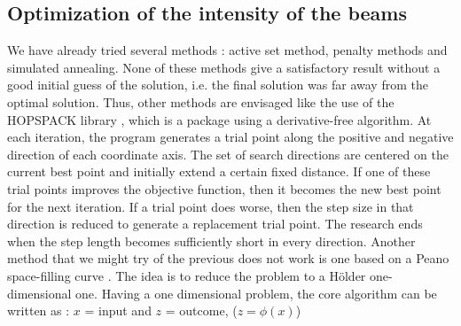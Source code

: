\subsection{Optimization of the intensity of the beams}
We have already tried several methods : active set method, penalty methods
and simulated annealing. None of these methods give a satisfactory result
without a good initial guess of the solution, i.e. the final solution was far
away from the optimal solution. Thus, other methods are envisaged like the 
use of the HOPSPACK library \cite{hopspack}, which is a package using a 
derivative-free algorithm. At each iteration, the program generates a trial 
point along the positive and negative direction of each coordinate axis. 
The set of search directions are centered on the current best point and 
initially extend a certain fixed distance. If one of these trial points 
improves the objective function, then it becomes the new best point for 
the next iteration. If a trial point does worse, then the step size in 
that direction is reduced to generate a replacement trial point. The research 
ends when the step length becomes sufficiently short in every direction. 
Another method that we might try of the previous does not work is one based 
on a Peano space-filling curve \cite{livre}. The idea is to reduce the 
problem to a H\"{o}lder one-dimensional one. Having a one dimensional problem, 
the core algorithm can be written as :
$x$ = input and $z$ = outcome, ($z=\phi(x)$)
